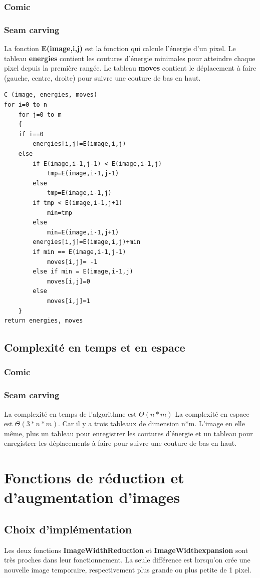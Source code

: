 \documentclass[10pt]{article}
\begin{document}
\subsubsection{Comic}
\subsubsection{Seam carving}
La fonction\textbf{ E(image,i,j)} est la fonction qui calcule l'énergie d'un pixel. Le tableau \textbf{energies} contient les coutures d'énergie minimales pour atteindre chaque pixel depuis la première rangée. Le tableau \textbf{moves} contient le déplacement à faire (gauche, centre, droite) pour suivre une couture de bas en haut. 
\begin{lstlisting}[frame=single]
C (image, energies, moves)
for i=0 to n
	for j=0 to m
	{
	if i==0
		energies[i,j]=E(image,i,j)
	else
		if E(image,i-1,j-1) < E(image,i-1,j)
			tmp=E(image,i-1,j-1)
		else
			tmp=E(image,i-1,j)
		if tmp < E(image,i-1,j+1)
			min=tmp
		else
			min=E(image,i-1,j+1)
		energies[i,j]=E(image,i,j)+min
		if min == E(image,i-1,j-1)			
			moves[i,j]= -1
		else if min = E(image,i-1,j)
			moves[i,j]=0
		else
			moves[i,j]=1
	}
return energies, moves
\end{lstlisting}

\subsection{Complexité en temps et en espace}
\subsubsection{Comic}
\subsubsection{Seam carving}
La complexité en temps de l'algorithme est $\Theta(n*m)$
La complexité en espace est $\Theta(3*n*m)$. Car il y a trois tableaux de dimension n*m. L'image en elle même, plus un tableau pour enregistrer les coutures d'énergie et un tableau pour enregistrer les déplacements à faire pour suivre une couture de bas en haut.

\section{Fonctions de réduction et d'augmentation d'images}
\subsection{Choix d'implémentation}
Les deux fonctions \textbf{ImageWidthReduction} et \textbf{ImageWidthexpansion} sont très proches dans leur fonctionnement. La seule différence est lorsqu'on crée une nouvelle image temporaire, respectivement plus grande ou plus petite de 1 pixel.
\end{document}
